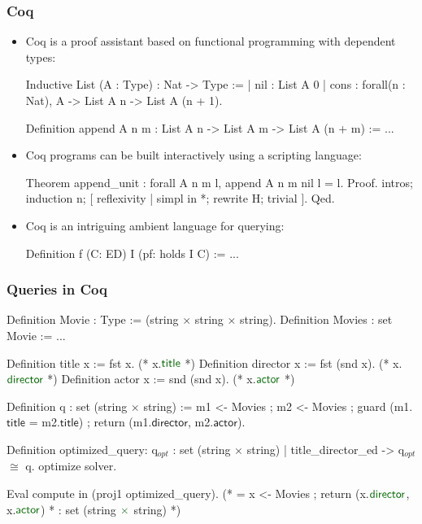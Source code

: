 \documentclass{beamer}
\begin{document}
\begin{frame}[fragile]
\frametitle{Coq}

\begin{itemize}

\item Coq is a proof assistant based on functional programming with dependent types:
\begin{coq}
Inductive List  (A : Type) : Nat -> Type :=
 | nil : List A 0
 | cons : forall(n : Nat), A -> List A n -> List A (n + 1). 
 
Definition append A n m  : List A n -> List A m -> List A (n + m) := ...
\end{coq}

\item Coq programs can be built interactively using a scripting language:
\begin{coq}
Theorem append_unit : forall A n m l, append A n m nil l = l.
Proof.
 intros; induction n; 
   [ reflexivity | simpl in *; rewrite H; trivial ].
Qed.
\end{coq}

\item Coq is an intriguing ambient language for querying:
\begin{coq}
Definition f (C: ED) I (pf: holds I C) := ...
\end{coq}
\end{itemize}
\end{frame}

\begin{frame}[fragile]
\frametitle{Queries in Coq}
\begin{coq}
Definition Movie : Type := (string $\times$ string $\times$ string).
Definition Movies : set Movie := ...

Definition title x := fst x. (* x.$\textcolor{dkgreen}{\textsf{title}}$ *)
Definition director x := fst (snd x). (* x.$\textcolor{dkgreen}{\textsf{director}}$ *)
Definition actor x := snd (snd x). (* x.$\textcolor{dkgreen}{\textsf{actor}}$ *)

Definition q : set (string $\times$ string) :=
  m1 <- Movies ; m2 <- Movies ;
  guard (m1.$\textsf{title}$ = m2.$\textsf{title}$) ;
  return (m1.$\textsf{director}$, m2.$\textsf{actor}$).
  
Definition optimized_query:
{q$_{opt}$ : set (string $\times$ string) | title_director_ed -> q$_{opt}$ $\cong$ q}.
optimize solver.

Eval compute in (proj1 optimized_query).
(* = x <- Movies ; return (x.$\textcolor{dkgreen}{\textsf{director}}$, x.$\textcolor{dkgreen}{\textsf{actor}}$)
 *   : set (string $\textcolor{dkgreen}{\times}$ string)   *)
\end{coq}
\end{frame}
\end{document}

